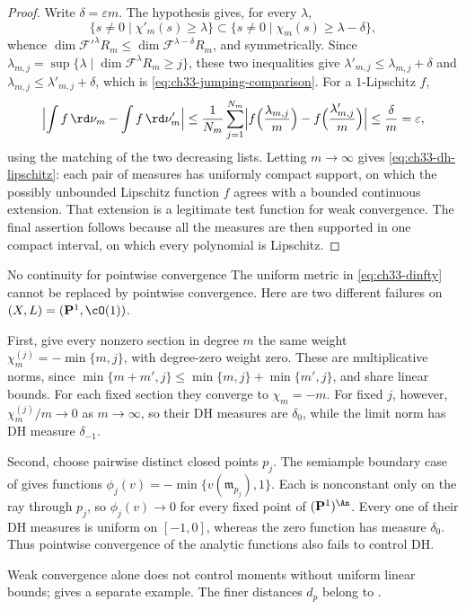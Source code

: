 \begin{proof}
Write $\delta=\varepsilon m$.  The hypothesis gives, for every
$\lambda$,
\[
 \{s\ne0\mid\chi'_m(s)\geq\lambda\}
 \subset\{s\ne0\mid\chi_m(s)\geq\lambda-\delta\},
\]
whence $\dim\mathcal F'^\lambda R_m\leq\dim\mathcal F^{\lambda-\delta}R_m$,
and symmetrically.  Since
$\lambda_{m,j}=\sup\{\lambda\mid\dim\mathcal F^\lambda R_m\geq j\}$, these
two inequalities give
$\lambda'_{m,j}\leq\lambda_{m,j}+\delta$ and
$\lambda_{m,j}\leq\lambda'_{m,j}+\delta$, which is
\eqref{eq:ch33-jumping-comparison}.  For a $1$-Lipschitz $f$,
\[
 \Bigl|\int f\,\rd\nu_m-\int f\,\rd\nu'_m\Bigr|
 \leq\frac1{N_m}\sum_{j=1}^{N_m}
      \Bigl|f\Bigl(\frac{\lambda_{m,j}}m\Bigr)
            -f\Bigl(\frac{\lambda'_{m,j}}m\Bigr)\Bigr|
 \leq\frac{\delta}{m}=\varepsilon,
\]
using the matching of the two decreasing lists.  Letting $m\to\infty$
gives \eqref{eq:ch33-dh-lipschitz}: each pair of measures has uniformly
compact support, on which the possibly unbounded Lipschitz function
$f$ agrees with a bounded continuous extension.  That extension is a
legitimate test function for weak convergence.  The final assertion follows
because all the measures are then supported in one compact interval, on
which every polynomial is Lipschitz.
\end{proof}

\begin{warning}{No continuity for pointwise convergence}
\label{warn:ch33-dh-no-pointwise-continuity}
The uniform metric in \eqref{eq:ch33-dinfty} cannot be replaced by
pointwise convergence.  Here are two different failures on
$(X,L)=(\mathbf P^1,\cO(1))$.

First, give every nonzero section in degree $m$ the same weight
$\chi_m^{(j)}=-\min\{m,j\}$, with degree-zero weight zero.
These are multiplicative norms, since
$\min\{m+m',j\}\leq\min\{m,j\}+\min\{m',j\}$, and share linear
bounds.  For each fixed section they converge to $\chi_m=-m$.
For fixed $j$, however, $\chi_m^{(j)}/m\to0$ as $m\to\infty$,
so their DH measures are $\delta_0$, while the limit norm has DH
measure $\delta_{-1}$.

Second, choose pairwise distinct closed points $p_j$.  The semiample
boundary case of  gives functions
$\phi_j(v)=-\min\{v(\mathfrak m_{p_j}),1\}$.
Each is nonconstant only on the ray through $p_j$, so
$\phi_j(v)\to0$ for every fixed point of $(\mathbf P^1)^{\An}$.
Every one of their DH measures is uniform on $[-1,0]$, whereas
the zero function has measure $\delta_0$.  Thus pointwise convergence
of the analytic functions also fails to control DH.

Weak convergence alone does not control moments without uniform
linear bounds;  gives a separate
example.  The finer distances $d_p$ belong to
.

\end{warning}

